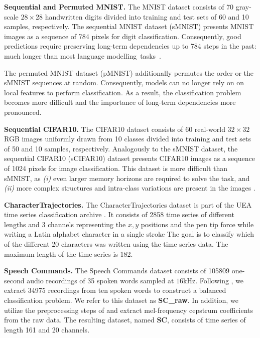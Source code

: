 \documentclass{article}
\begin{document}
\textbf{Sequential and Permuted MNIST.} The MNIST dataset \citep{lecun1998gradient} consists of 70{} gray-scale $28\times28$ handwritten digits divided into training and test sets of 60{} and 10{} samples, respectively. The sequential MNIST dataset (sMNIST) presents MNIST images as a sequence of 784 pixels for digit classification. Consequently, good predictions require preserving long-term dependencies up to 784 steps in the past: much longer than most language modelling~tasks~\citep{bai2018trellis}.

The permuted MNIST dataset (pMNIST) additionally permutes the order or the sMNIST sequences at random. Consequently, models can no longer rely on on local features to perform classification. As a result, the classification problem becomes more difficult and the importance of long-term dependencies more pronounced.   

\textbf{Sequential CIFAR10.} The CIFAR10 dataset \citep{krizhevsky2009learning} consists of 60{} real-world $32\times32$ RGB images uniformly drawn from 10 classes divided into training and test sets of 50{} and 10{} samples, respectively. Analogously to the sMNIST dataset, the sequential CIFAR10 (sCIFAR10) dataset presents CIFAR10 images as a sequence of 1024 pixels for image classification. This dataset is more difficult than sMNIST, as \emph{(i)} even larger memory horizons are required to solve the task, and \emph{(ii)} more complex structures and intra-class variations are present in the images \citep{trinh2018learning}. 

\textbf{CharacterTrajectories.} The CharacterTrajectories dataset is part of the UEA time series classification archive \citep{bagnall2018uea}. It consists of 2858 time series of different lengths and 3 channels representing the $x,y$ positions and the pen tip force while writing a Latin alphabet character in a single stroke The goal is to classify which of the different 20 characters was written using the time series data. The maximum length of the time-series is 182.

\textbf{Speech Commands.} The Speech Commands dataset \citep{warden2018speech} consists of 105809 one-second audio recordings of 35 spoken words sampled at $16$kHz. Following \citet{kidger2020neural}, we extract 34975 recordings from ten spoken words to construct a balanced classification problem. We refer to this dataset as \textbf{SC\_raw}. In addition, we utilize the preprocessing steps of \citet{kidger2020neural} and extract mel-frequency cepstrum coefficients from the raw data. The resulting dataset, named \textbf{SC}, consists of time series of length 161 and 20 channels. 
\end{document}
